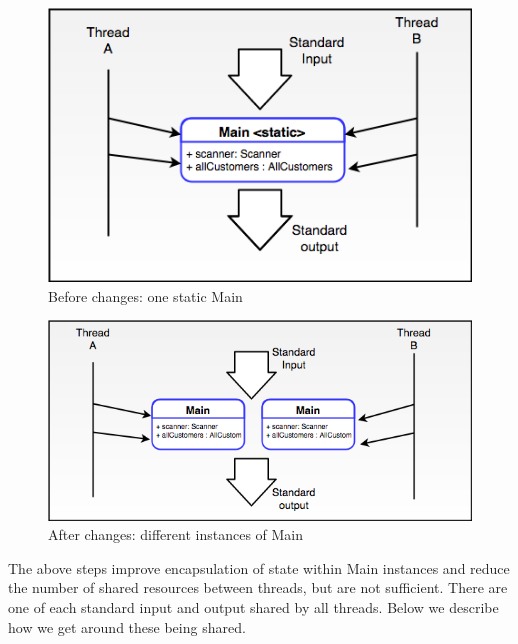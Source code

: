 \begin{minipage}[b]{0.5\textwidth}
\begin{figure}[H]
\centering
\includegraphics[scale=0.4]{res/STE-Page-1-original.png}
\caption{Before changes: one static Main}
\end{figure}
\end{minipage}
\begin{minipage}[b]{0.5\textwidth}
\begin{figure}[H]
\centering
\includegraphics[scale=0.4]{res/STE-Page-2-original.png}	
\caption{After changes: different instances of Main}
\end{figure}
\end{minipage}

The above steps improve encapsulation of state within Main instances and reduce the number of shared resources between threads, but are not sufficient. There are one of each standard input and output shared by all threads. Below we describe how we get around these being shared. 

